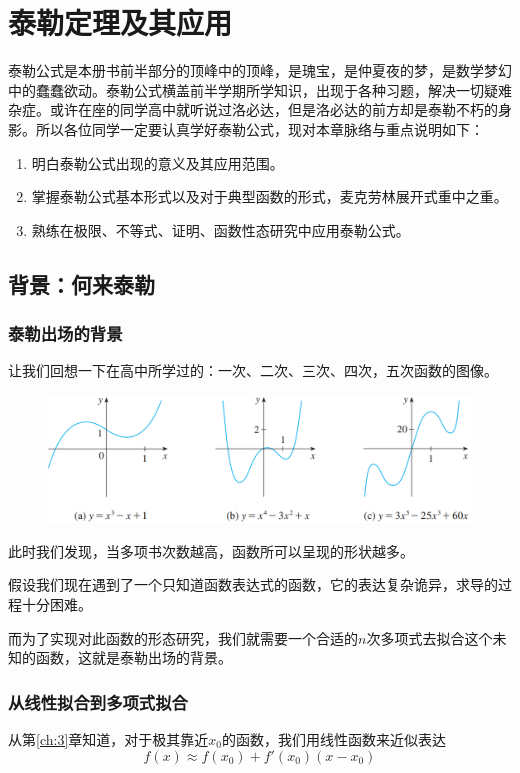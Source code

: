 \chapter{泰勒定理及其应用}\label{ch:5}

泰勒公式是本册书前半部分的顶峰中的顶峰，是瑰宝，是仲夏夜的梦，是数学梦幻中的蠢蠢欲动。泰勒公式横盖前半学期所学知识，出现于各种习题，解决一切疑难杂症。或许在座的同学高中就听说过洛必达，但是洛必达的前方却是泰勒不朽的身影。所以各位同学一定要认真学好泰勒公式，现对本章脉络与重点说明如下：
\begin{enumerate}
	\item 明白泰勒公式出现的意义及其应用范围。
	\item 掌握泰勒公式基本形式以及对于典型函数的形式，麦克劳林展开式重中之重。
	\item 熟练在极限、不等式、证明、函数性态研究中应用泰勒公式。
\end{enumerate}

\section{背景：何来泰勒}\label{sec:5.1}

\subsection{泰勒出场的背景}\label{sec:5.1.1}

让我们回想一下在高中所学过的：一次、二次、三次、四次，五次函数的图像。
\begin{figure}[tbph]
	\centering
	\includegraphics[width=0.7\linewidth]{figures/多项式函数图片}
	\caption{}
	\label{fig:5.1}
\end{figure}
此时我们发现，当多项书次数越高，函数所可以呈现的形状越多。

假设我们现在遇到了一个只知道函数表达式的函数，它的表达复杂诡异，求导的过程十分困难。

而为了实现对此函数的形态研究，我们就需要一个合适的$n$次多项式去拟合这个未知的函数，这就是泰勒出场的背景。

\subsection{从线性拟合到多项式拟合}\label{sec:5.1.2}
从第\ref{ch:3}章知道，对于极其靠近$x_0$的函数，我们用线性函数来近似表达
\begin{equation}
	f(x)\approx f(x_0)+f'(x_0)(x-x_0)\label{eq:5.1}
\end{equation}

